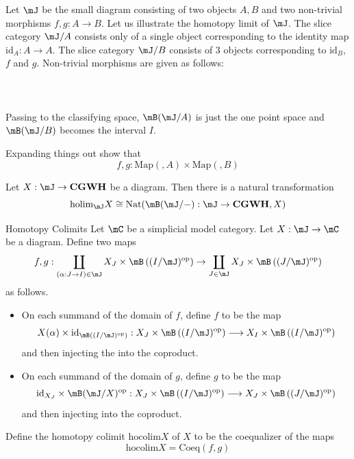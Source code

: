 \documentclass[a4paper]{article}
\begin{document}
Let $\mJ$ be the small diagram consisting of two objects $A,B$ and two non-trivial morphisms $f,g:A\to B$. Let us illustrate the homotopy limit of $\mJ$. The slice category $\mJ/A$ consists only of a single object corresponding to the identity map $\text{id}_A:A\to A$. The slice category $\mJ/B$ consists of $3$ objects corresponding to $\text{id}_B$, $f$ and $g$. Non-trivial morphisms are given as follows: \\~\\
\\~\\
Passing to the classifying space, $\mB(\mJ/A)$ is just the one point space and $\mB(\mJ/B)$ becomes the interval $I$. 

Expanding things out show that $$f,g:\text{Map}(,A)\times\text{Map}(,B)$$ 

\begin{prp}{}{} Let $X:\mJ\to\bold{CGWH}$ be a diagram. Then there is a natural transformation $$\text{holim}_\mJ X\cong\text{Nat}(\mB(\mJ/-):\mJ\to\bold{CGWH},X)$$
\end{prp}

\begin{defn}{Homotopy Colimits}{} Let $\mC$ be a simplicial model category. Let $X:\mJ\to\mC$ be a diagram. Define two maps $$f,g:\coprod_{(\alpha:J\to I)\in\mJ}X_J\times\mB\left((I/\mJ)^\text{op}\right)\to\coprod_{J\in\mJ}X_J\times\mB\left((J/\mJ)^\text{op}\right)$$ as follows. 
\begin{itemize}
\item On each summand of the domain of $f$, define $f$ to be the map $$X(\alpha)\times\text{id}_{\mB\left((I/\mJ)^\text{op}\right)}:X_J\times\mB\left((I/\mJ)^\text{op}\right)\longrightarrow X_I\times\mB\left((I/\mJ)^\text{op}\right)$$ and then injecting the into the coproduct. 
\item On each summand of the domain of $g$, define $g$ to be the map $$\text{id}_{X_J}\times\mB(\mJ/X)^\text{op}:X_J\times\mB\left((I/\mJ)^\text{op}\right)\longrightarrow X_J\times\mB\left((J/\mJ)^\text{op}\right)$$ and then injecting into the coproduct. 
\end{itemize}
Define the homotopy colimit $\text{hocolim} X$ of $X$ to be the coequalizer of the maps $$\text{hocolim} X=\text{Coeq}(f,g)$$
\end{defn}
\end{document}
